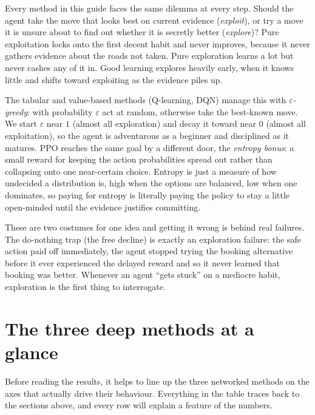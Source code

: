 \documentclass[11pt]{article}
\newcommand{\key}[1]{\textit{#1}}            %
\begin{document}
Every method in this guide faces the same dilemma at every step. Should the agent take the
move that looks best on current evidence (\key{exploit}), or try a move it is unsure about to
find out whether it is secretly better (\key{explore})? Pure exploitation locks onto the
first decent habit and never improves, because it never gathers evidence about the roads not
taken. Pure exploration learns a lot but never cashes any of it in. Good learning explores
heavily early, when it knows little and shifts toward exploiting as the evidence piles up.

The tabular and value-based methods (Q-learning, DQN) manage this with
\key{$\varepsilon$-greedy}: with probability $\varepsilon$ act at random, otherwise take the
best-known move. We start $\varepsilon$ near $1$ (almost all exploration) and decay it toward
near $0$ (almost all exploitation), so the agent is adventurous as a beginner and disciplined
as it matures. PPO reaches the same goal by a different door, the \key{entropy bonus}: a small
reward for keeping the action probabilities spread out rather than collapsing onto one
near-certain choice. Entropy is just a measure of how undecided a distribution is, high when
the options are balanced, low when one dominates, so paying for entropy is literally paying
the policy to stay a little open-minded until the evidence justifies committing.

These are two costumes for one idea and getting it wrong is behind real failures. The
do-nothing trap (the free decline) is exactly an exploration failure: the safe action paid off
immediately, the agent stopped trying the booking alternative before it ever experienced the
delayed reward and so it never learned that booking was better. Whenever an agent ``gets
stuck'' on a mediocre habit, exploration is the first thing to interrogate.

\section{The three deep methods at a glance}

Before reading the results, it helps to line up the three networked methods on the axes that
actually drive their behaviour. Everything in the table traces back to the sections above,
and every row will explain a feature of the numbers.
\end{document}
